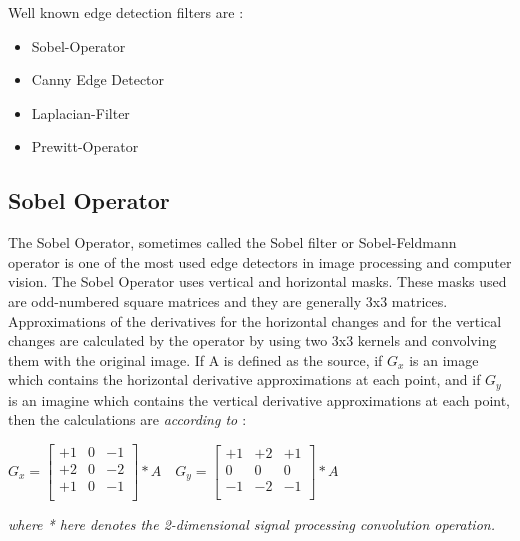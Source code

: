 Well known edge detection filters are :

\begin{itemize}

 \item Sobel-Operator
 \item Canny Edge Detector
 \item Laplacian-Filter
 \item Prewitt-Operator
 
 \end{itemize}


%
\subsection{Sobel Operator}\label{sec:Sobel Operator}

The Sobel Operator, sometimes called the Sobel filter or Sobel-Feldmann operator is one of the most used edge detectors in image processing and computer vision. The Sobel Operator uses vertical and horizontal masks. These masks used are odd-numbered square matrices and they are generally 3x3 matrices. Approximations of the derivatives for the horizontal changes and for the vertical changes are calculated by the operator by using two 3x3 kernels and convolving them with the original image. If A is defined as the source, if $G_{x}$ is an image which contains the horizontal derivative approximations at each point, and if $G_{y}$ is an imagine which contains the vertical derivative approximations at each point, then the calculations are \emph{\color{red}according to \cite{SobelOperatorandCannyEdgeDetector}}:

\begin{center}

$  G_{x} = 
  \begin{bmatrix}
	+1 & 0 & -1 \\
	+2 & 0 & -2 \\
	+1 & 0 & -1 \\
   \end{bmatrix} * A  \quad
  G_{y} = 
  \begin{bmatrix}
	+1 & +2 & +1 \\
	0 & 0 & 0 \\
	-1 & -2 & -1 \\
  \end{bmatrix} * A		$

\end{center}

\emph{\color{blue}where * here denotes the 2-dimensional signal processing convolution operation.}

